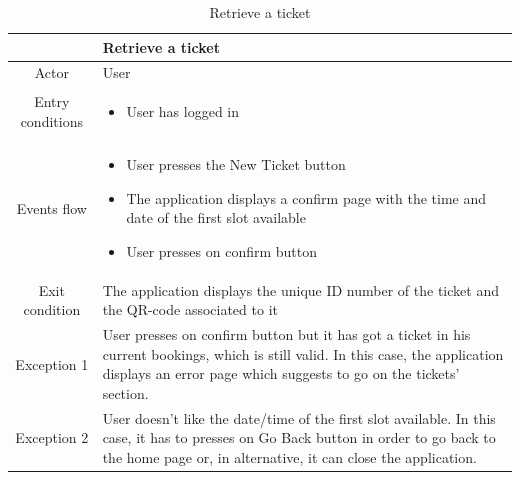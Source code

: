 \documentclass[table, 12pt]{article}
\begin{document}
\begin{longtable}{|c| p{10cm}|}
    \caption{Retrieve a ticket}                                                                                                                                                                                                 \\
    \hline
                     & Retrieve a ticket                                                                                                                                                                                        \\
    \hline
    Actor            & User                                                                                                                                                                                                     \\
    \hline
    Entry conditions & \begin{itemize}
        \item User has logged in
    \end{itemize}                                                                                                                                                                               \\
    \hline
    Events flow      & \begin{itemize}
        \item User presses the New Ticket button
        \item The application displays a confirm page with the time and date of the first slot available
        \item User presses on confirm button
    \end{itemize}                                                                                                                                                                               \\
    \hline
    Exit condition   &
    The application displays the unique ID number of the ticket and the QR-code associated to it                                                                                                                                \\
    \hline
    \hline
    Exception 1      & User presses on confirm button but it has got a ticket in his current bookings, which is still valid. In this case, the application displays an error page which suggests to go on the tickets' section. \\
    \hline
    Exception 2      & User doesn't like the date/time of the first slot available. In this case, it has to presses on Go Back button in order to go back to the home page or, in alternative, it can close the application.    \\
    \hline
\end{longtable}
\end{document}
